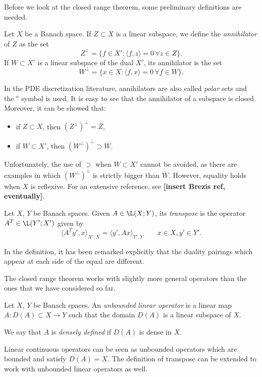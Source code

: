 Before we look at the closed range theorem, some preliminary definitions are needed.
\begin{definition}
	Let $X$ be a Banach space. If $Z \subset X$ is a linear subspace, we define the \emph{annihilator} of $Z$ as the set
	\[
	Z^\perp = \{f \in X' : \langle f, z \rangle = 0 \, \forall z \in Z\}.
	\]
	If $W \subset X'$ is a linear subspace of the dual $X'$, its annihilator is the set
	\[
	W^\perp = \{x \in X : \langle f, x \rangle = 0 \, \forall f \in W\}.
	\]
\end{definition}

In the PDE discretization literature, annihilators are also called \emph{polar} sets and the $^o$ symbol is used. It is easy to see that the annihilator of a subspace is closed. Moreover, it can be showed that:
\begin{itemize}
	\item if $Z \subset X$, then $(Z^\perp)^\perp = \overline{Z}$,
	\item if $W \subset X'$, then $(W^\perp)^\perp \supset \overline{W}$.
\end{itemize}
Unfortunately, the use of $\supset$ when $W \subset X'$ cannot be avoided, as there are examples in which $(W^\perp)^\perp$ is strictly bigger than $\overline{W}$. However, equality holds when $X$ is reflexive. For an extensive reference, see \textbf{[insert Brezis ref, eventually]}.

\begin{definition}
	Let $X$, $Y$ be Banach spaces. Given $A \in \L(X;Y)$, its \emph{transpose} is the operator $A^T \in \L(Y';X')$ given by
	\[
	\langle A^T y', x \rangle_{X',X} = \langle y', Ax \rangle_{Y',Y} \qquad x \in X, y' \in Y'.
	\]
\end{definition}
In the definition, it has been remarked explicitly that the duality pairings which appear at each side of the equal are different.

The closed range theorem works with slightly more general operators than the ones that we have considered so far.
\begin{definition}
	Let $X$, $Y$ be Banach spaces. An \emph{unbounded linear operator} is a linear map $A: D(A) \subset X \to Y$ such that the domain $D(A)$ is a linear subspace of $X$.
	
	We say that $A$ is \emph{densely defined} if $D(A)$ is dense in $X$.
\end{definition}
Linear continuous operators can be seen as unbounded operators which are bounded and satisfy $D(A) = X$.
The definition of transpose can be extended to work with unbounded linear operators as well.

